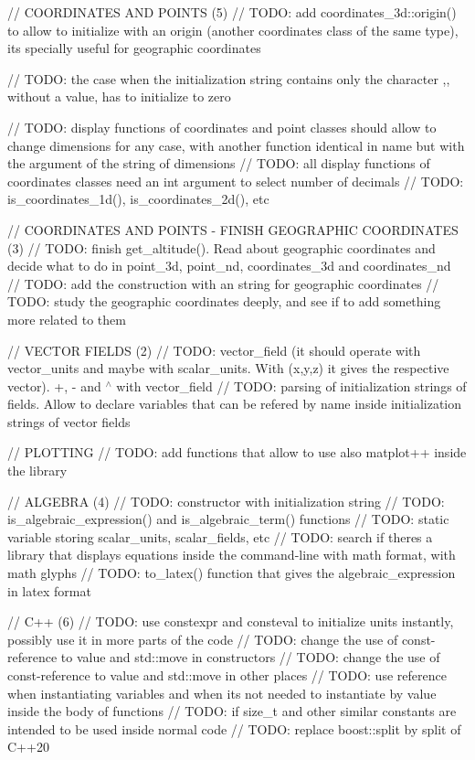 // COORDINATES AND POINTS (5) // TODO\+: add coordinates\+\_\+3d\+::origin() to allow to initialize with an origin (another coordinates class of the same type), it\textquotesingle{}s specially useful for geographic coordinates

// TODO\+: the case when the initialization string contains only the character \textquotesingle{},\textquotesingle{}, without a value, has to initialize to zero

// TODO\+: display functions of coordinates and point classes should allow to change dimensions for any case, with another function identical in name but with the argument of the string of dimensions // TODO\+: all display functions of coordinates classes need an int argument to select number of decimals // TODO\+: is\+\_\+coordinates\+\_\+1d(), is\+\_\+coordinates\+\_\+2d(), etc

// COORDINATES AND POINTS -\/ FINISH GEOGRAPHIC COORDINATES (3) // TODO\+: finish get\+\_\+altitude(). Read about geographic coordinates and decide what to do in point\+\_\+3d, point\+\_\+nd, coordinates\+\_\+3d and coordinates\+\_\+nd // TODO\+: add the construction with an string for geographic coordinates // TODO\+: study the geographic coordinates deeply, and see if to add something more related to them

// VECTOR FIELDS (2) // TODO\+: vector\+\_\+field (it should operate with vector\+\_\+units and maybe with scalar\+\_\+units. With (x,y,z) it gives the respective vector). +, -\/ and $^\wedge$ with vector\+\_\+field // TODO\+: parsing of initialization strings of fields. Allow to declare variables that can be refered by name inside initialization strings of vector fields

// PLOTTING // TODO\+: add functions that allow to use also matplot++ inside the library

// ALGEBRA (4) // TODO\+: constructor with initialization string // TODO\+: is\+\_\+algebraic\+\_\+expression() and is\+\_\+algebraic\+\_\+term() functions // TODO\+: static variable storing scalar\+\_\+units, scalar\+\_\+fields, etc // TODO\+: search if there\textquotesingle{}s a library that displays equations inside the command-\/line with math format, with math glyphs // TODO\+: to\+\_\+latex() function that gives the algebraic\+\_\+expression in latex format

// C++ (6) // TODO\+: use constexpr and consteval to initialize units instantly, possibly use it in more parts of the code // TODO\+: change the use of const-\/reference to value and std\+::move in constructors // TODO\+: change the use of const-\/reference to value and std\+::move in other places // TODO\+: use reference when instantiating variables and when it\textquotesingle{}s not needed to instantiate by value inside the body of functions // TODO\+: if size\+\_\+t and other similar constants are intended to be used inside normal code // TODO\+: replace boost\+::split by split of C++20

